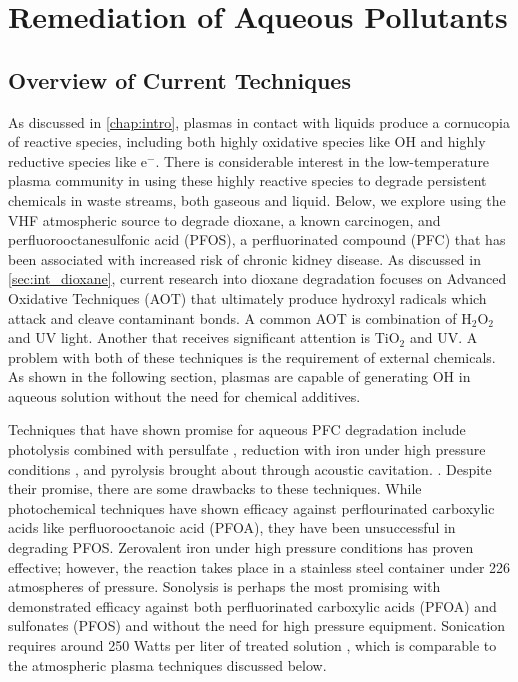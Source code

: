 \section{Remediation of Aqueous Pollutants}
\label{sec:pollutant}

\subsection{Overview of Current Techniques}
\label{sec:poll_overview}

As discussed in \cref{chap:intro}, plasmas in contact with liquids produce a cornucopia of reactive species, including both highly oxidative species like OH and highly reductive species like e$^-$. There is considerable interest in the low-temperature plasma community in using these highly reactive species to degrade persistent chemicals in waste streams, both gaseous and liquid. Below, we explore using the VHF atmospheric source to degrade dioxane, a known carcinogen, and perfluorooctanesulfonic acid (PFOS), a perfluorinated compound (PFC) that has been associated with increased risk of chronic kidney disease. \cite{shankar2011perfluoroalkyl} As discussed in \cref{sec:int_dioxane}, current research into dioxane degradation focuses on Advanced Oxidative Techniques (AOT) that ultimately produce hydroxyl radicals which attack and cleave contaminant bonds. A common AOT is combination of H$_2$O$_2$ and UV light. Another that receives significant attention is TiO$_2$ and UV. A problem with both of these techniques is the requirement of external chemicals. As shown in the following section, plasmas are capable of generating OH in aqueous solution without the need for chemical additives.

Techniques that have shown promise for aqueous PFC degradation include photolysis combined with persulfate \cite{hori2005efficient}, reduction with iron under high pressure conditions \cite{hori2006efficient}, and pyrolysis brought about through acoustic cavitation. \cite{moriwaki2005sonochemical,cheng2008sonochemical}. Despite their promise, there are some drawbacks to these techniques. While photochemical techniques have shown efficacy against perflourinated carboxylic acids like perfluorooctanoic acid (PFOA), they have been unsuccessful in degrading PFOS. \cite{hori2006efficient} Zerovalent iron under high pressure conditions has proven effective; however, the reaction takes place in a stainless steel container under 226 atmospheres of pressure. \cite{hori2006efficient} Sonolysis is perhaps the most promising with demonstrated efficacy against both perfluorinated carboxylic acids (PFOA) and sulfonates (PFOS) and without the need for high pressure equipment. Sonication requires around 250 Watts per liter of treated solution \cite{cheng2008sonochemical}, which is comparable to the atmospheric plasma techniques discussed below.

